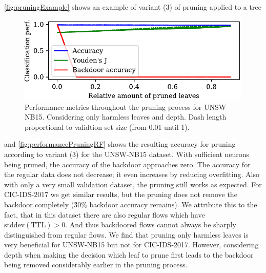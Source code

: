\documentclass[10pt,sigconf,letterpaper,dvipsnames]{acmart}
\newcommand\note[2]{{\color{#1}#2}}
\newcommand\todo[1]{{\note{red}{TODO: #1}}}
\newcommand{\unsw}{UNSW-NB15}
\newcommand{\cic}{CIC-IDS-2017}
\begin{document}
\autoref{fig:pruningExample} shows an example of variant (3) of pruning applied to a tree
\begin{figure}[h]
\includegraphics[width=\columnwidth]{../prune_CAIA_backdoor_15/prune_oh_d.pdf}
\caption{Performance metrics throughout the pruning process for \unsw{}. Considering only harmless leaves and depth. Dash length proportional to validtion set size (from 0.01 until 1).}
\label{fig:performancePruningRF}
\end{figure}
and \autoref{fig:performancePruningRF} shows the resulting accuracy for pruning according to variant (3) for the \unsw{} dataset. With sufficient neurons being pruned, the accuracy of the backdoor approaches zero. The accuracy for the regular data does not decrease; it even increases by
reducing overfitting. %
Also with only a very small validation dataset, the pruning still works as expected. For \cic{} we get similar results, but the pruning does not remove the backdoor completely (\~30\% backdoor accuracy remains). We attribute this to the fact, that in this dataset there are also regular flows which have $\text{stddev}(\text{TTL}) > 0$. And thus backdoored flows cannot always be sharply distinguished from regular flows. We find that pruning only harmless leaves is very beneficial for \unsw{} but not for \cic{}. However, considering depth when making the decision which leaf to prune first leads to the backdoor being removed considerably earlier in the pruning process. 
\end{document}

